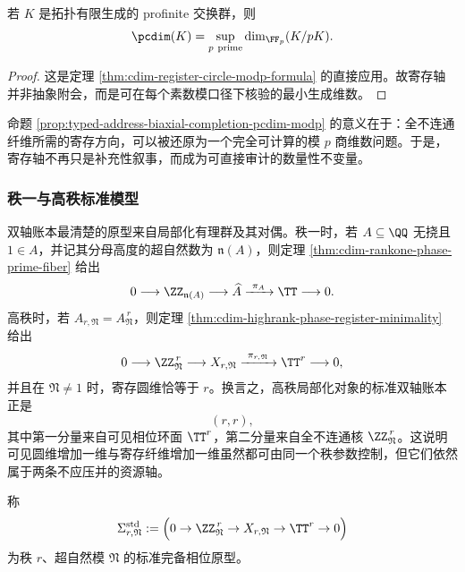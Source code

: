 \begin{proposition}[寄存圆维的模素数公式]\label{prop:typed-address-biaxial-completion-pcdim-modp}
若 \(K\) 是拓扑有限生成的 profinite 交换群，则
\[
\pcdim(K)=\sup_{p\ \mathrm{prime}}\dim_{\FF_p}(K/pK).
\]
\end{proposition}
\begin{proof}
这是定理 \ref{thm:cdim-register-circle-modp-formula} 的直接应用。故寄存轴并非抽象附会，而是可在每个素数模口径下核验的最小生成维数。
\end{proof}

命题 \ref{prop:typed-address-biaxial-completion-pcdim-modp} 的意义在于：全不连通纤维所需的寄存方向，可以被还原为一个完全可计算的模 \(p\) 商维数问题。于是，寄存轴不再只是补充性叙事，而成为可直接审计的数量性不变量。

\subsubsection{秩一与高秩标准模型}\label{subsubsec:typed-address-biaxial-completion-ledger-standard-models}
双轴账本最清楚的原型来自局部化有理群及其对偶。秩一时，若 \(A\subseteq\QQ\) 无挠且 \(1\in A\)，并记其分母高度的超自然数为 \(\mathfrak n(A)\)，则定理 \ref{thm:cdim-rankone-phase-prime-fiber} 给出
\[
0\longrightarrow \ZZ_{\mathfrak n(A)}
\longrightarrow \widehat A
\xrightarrow{\ \pi_A\ }
\TT
\longrightarrow 0.
\]
高秩时，若 \(A_{r,\mathfrak N}=A_{\mathfrak N}^{\,r}\)，则定理 \ref{thm:cdim-highrank-phase-register-minimality} 给出
\[
0\longrightarrow \ZZ_{\mathfrak N}^{\,r}
\longrightarrow X_{r,\mathfrak N}
\xrightarrow{\ \pi_{r,\mathfrak N}\ }
\TT^r
\longrightarrow 0,
\]
并且在 \(\mathfrak N\neq 1\) 时，寄存圆维恰等于 \(r\)。换言之，高秩局部化对象的标准双轴账本正是
\[
(r,r),
\]
其中第一分量来自可见相位环面 \(\TT^r\)，第二分量来自全不连通核 \(\ZZ_{\mathfrak N}^{\,r}\)。这说明可见圆维增加一维与寄存纤维增加一维虽然都可由同一个秩参数控制，但它们依然属于两条不应压并的资源轴。

\begin{definition}[标准双轴原型]\label{def:typed-address-biaxial-completion-standard-biaxial-prototype}
称
\[
\Sigma^{\mathrm{std}}_{r,\mathfrak N}
:=
\Bigl(
0\to \ZZ_{\mathfrak N}^{\,r}\to X_{r,\mathfrak N}\to \TT^r\to 0
\Bigr)
\]
为秩 \(r\)、超自然模 \(\mathfrak N\) 的标准完备相位原型。
\end{definition}

